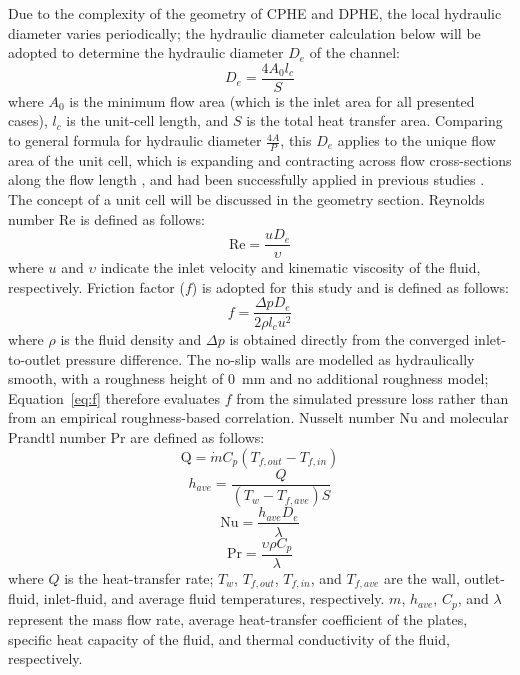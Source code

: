 \documentclass[energies,article,submit,moreauthors,noheaderline]{Definitions/mdpi}
\def\,{ }%
\begin{document}
Due to the complexity of the geometry of CPHE and DPHE, the local hydraulic diameter varies periodically; the hydraulic diameter calculation below will be adopted to determine the hydraulic diameter $D_e$ of the channel:
\begin{equation}
D_e=\frac{4A_0 l_c}{S}
\label{eq:De}
\end{equation}
where $A_0$ is the minimum flow area (which is the inlet area for all presented cases), $l_c$ is the unit-cell length, and $S$ is the total heat transfer area. Comparing to general formula for hydraulic diameter $\frac{4A}{P}$, this  $D_e$ applies to the unique flow area of the unit cell, which is expanding and contracting across flow cross-sections along the flow length \citep{zohuri2017}, and had been successfully applied in previous studies \citep{jiang2019a, He2013}. The concept of a unit cell will be discussed in the geometry section. Reynolds number Re is defined as follows:
\begin{equation}
\text{Re}=\frac{uD_e}{\upsilon}
\label{eq:Re}
\end{equation}
where $u$ and $\upsilon$ indicate the inlet velocity and kinematic viscosity of the fluid, respectively. Friction factor ($f$) is adopted for this study and is defined as follows:
\begin{equation}
f=\frac{\Delta p \, D_e}{2\rho \, l_c \, u^2}
\label{eq:f}
\end{equation}
where $\rho$ is the fluid density and $\Delta p$ is obtained directly from the converged inlet-to-outlet pressure difference. The no-slip walls are modelled as hydraulically smooth, with a roughness height of 0~mm and no additional roughness model; Equation~\eqref{eq:f} therefore evaluates $f$ from the simulated pressure loss rather than from an empirical roughness-based correlation. Nusselt number Nu and molecular Prandtl number Pr are defined as follows:
\begin{equation}
\text{Q}=\dot{m}C_p (T_{f,out}-T_{f,in}) 
\label{eq:Q}
\end{equation}
\begin{equation}
h_{ave}=\frac{Q}{(T_w - T_{f,ave})S} 
\label{eq:h_ave}
\end{equation}
\begin{equation}
\text{Nu}=\frac{h_{ave} D_e}{\lambda} 
\label{eq:Nu}
\end{equation}
\begin{equation}
\text{Pr}=\frac{\upsilon\rho C_p}{\lambda}
\label{eq:Pr}
\end{equation}
where $Q$ is the heat-transfer rate; $T_w$, $T_{f,out}$, $T_{f,in}$, and $T_{f,ave}$ are the wall, outlet-fluid, inlet-fluid, and average fluid temperatures, respectively. $m$, $h_{ave}$, $C_p$, and $\lambda$ represent the mass flow rate, average heat-transfer coefficient of the plates, specific heat capacity of the fluid, and thermal conductivity of the fluid, respectively.
\end{document}
